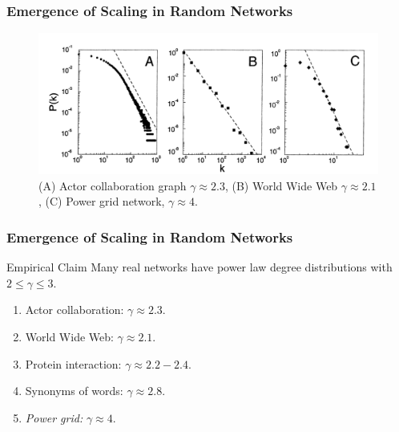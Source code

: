 \documentclass{beamer}
\begin{document}
		
		\begin{frame}\frametitle{Emergence of Scaling in Random Networks}

		\begin{figure}
			\centering
			\includegraphics[width=\textwidth]{BA_data}
			\caption{(A) Actor collaboration graph $\gamma \approx 2.3$, (B) World Wide Web $\gamma \approx 2.1$, (C) Power grid network, $\gamma \approx 4$.}
		\end{figure}

		\end{frame}

		
		\begin{frame}\frametitle{Emergence of Scaling in Random Networks}
		  	
		  	\begin{block}{Empirical Claim}
		  		Many real networks have power law degree distributions with  $2 \leq \gamma \leq 3$.
		  	\end{block}
		  	\begin{enumerate}
		  		\item Actor collaboration: $\gamma \approx 2.3$.
		  		\item World Wide Web: $\gamma \approx 2.1$.
		  		\item Protein interaction: $\gamma \approx 2.2-2.4$.
		  		\item Synonyms of words: $\gamma \approx 2.8$.
		  		\item \emph{Power grid: } $\gamma \approx 4$.
		  	\end{enumerate}
		\end{frame}
		
\end{document}
